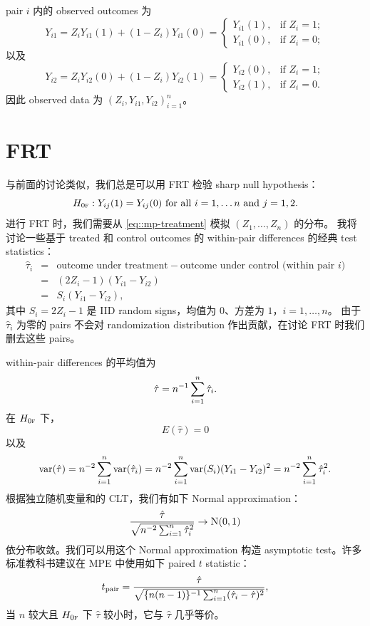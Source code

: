  
 
pair $i$ 内的 observed outcomes 为
$$
Y_{i1} = Z_i Y_{i1}(1) + (1-Z_i) Y_{i1}(0)
= \begin{cases}
   Y_{i1}(1),& \text{if } Z_i = 1; \\
   Y_{i1}(0), & \text{if } Z_i = 0; 
\end{cases}
$$
以及
$$
Y_{i2} = Z_i Y_{i2}(0) + (1-Z_i) Y_{i2}(1)
= \begin{cases}
   Y_{i2}(0),& \text{if } Z_i = 1; \\
   Y_{i2}(1), & \text{if } Z_i = 0 . 
\end{cases} 
$$
因此 observed data 为 $( Z_i, Y_{i1} , Y_{i2} )_{i=1}^n$。
 
 
\section{FRT}
 
与前面的讨论类似，我们总是可以用 FRT 检验 sharp null hypothesis：
$$
H_{0\textsc{f}}: Y_{ij}(1) = Y_{ij}(0)  \text{ for all }  i=1,\ldots  n  \text{ and } j=1,2. 
$$
进行 FRT 时，我们需要从 \eqref{eq::mp-treatment} 模拟 $(Z_1, \ldots, Z_n)$ 的分布。
我将讨论一些基于 treated 和 control outcomes 的 within-pair differences 的经典 test statistics：
\begin{eqnarray*}
\hat{\tau}_i &=& \text{outcome under treatment} - \text{outcome under control} \text{ (within pair } i) \\
&=&  (2Z_i - 1) (Y_{i1}  - Y_{i2})\\
&=& S_i (Y_{i1}  - Y_{i2})  , 
\end{eqnarray*}
其中 $S_i = 2Z_i - 1$ 是 IID random signs，均值为 $0$、方差为 $1$，$i=1,\ldots, n$。
由于 $\hat{\tau}_i $ 为零的 pairs 不会对 randomization distribution 作出贡献，在讨论 FRT 时我们删去这些 pairs。
 
\begin{example} 
\label{eg::paired-t-statistic}
within-pair differences 的平均值为
$$
\hat{\tau} = n^{-1}  \sum_{i=1}^n \hat{\tau}_i .
$$
在 $H_{0\textsc{f}}$ 下，
$$
E(\hat{\tau} ) = 0
$$
以及
$$
\textup{var}(  \hat{\tau}   ) 
= n^{-2} \sum_{i=1}^n \textup{var}(  \hat{\tau}_i ) 
= n^{-2} \sum_{i=1}^n \textup{var}(S_i) (Y_{i1}  - Y_{i2})^2 =  n^{-2} \sum_{i=1}^n  \hat{\tau}_i^2 . 
$$
根据独立随机变量和的 CLT，我们有如下 Normal approximation：
$$
\frac{  \hat{\tau}  }{ \sqrt{  n^{-2} \sumn  \hat{\tau}_i^2 } } \rightarrow \N01 
$$
依分布收敛。我们可以用这个 Normal approximation 构造 asymptotic test。许多标准教科书建议在 MPE 中使用如下 paired $t$ statistic：
$$
t_\text{pair} = \frac{  \hat{\tau}  }{ \sqrt{  \{ n(n-1) \}^{-1} \sum_{i=1}^n  (\hat{\tau}_i - \hat{\tau} ) ^2 } },
$$
当 $n$ 较大且 $H_{0\textsc{f}}$ 下 $\hat{\tau} $ 较小时，它与 $\hat{\tau}$ 几乎等价。
\end{example} 

